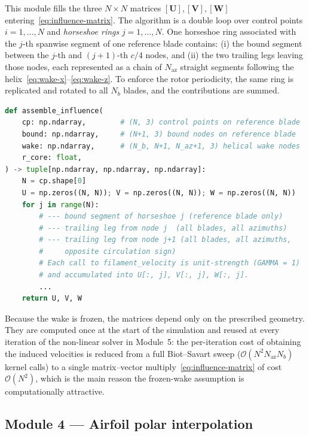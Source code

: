 This module fills the three $N\times N$ matrices $[\mathbf{U}],[\mathbf{V}],[\mathbf{W}]$ entering~\eqref{eq:influence-matrix}. The algorithm is a double loop over control points $i=1,\dots,N$ and \emph{horseshoe rings} $j=1,\dots,N$. One horseshoe ring associated with the $j$-th spanwise segment of one reference blade contains: (i) the bound segment between the $j$-th and $(j{+}1)$-th $c/4$ nodes, and (ii) the two trailing legs leaving those nodes, each represented as a chain of $N_{\text{az}}$ straight segments following the helix~\eqref{eq:wake-x}--\eqref{eq:wake-z}. To enforce the rotor periodicity, the same ring is replicated and rotated to all $N_b$ blades, and the contributions are summed.

\begin{lstlisting}[language=Python]
def assemble_influence(
    cp: np.ndarray,        # (N, 3) control points on reference blade
    bound: np.ndarray,     # (N+1, 3) bound nodes on reference blade
    wake: np.ndarray,      # (N_b, N+1, N_az+1, 3) helical wake nodes
    r_core: float,
) -> tuple[np.ndarray, np.ndarray, np.ndarray]:
    N = cp.shape[0]
    U = np.zeros((N, N)); V = np.zeros((N, N)); W = np.zeros((N, N))
    for j in range(N):
        # --- bound segment of horseshoe j (reference blade only)
        # --- trailing leg from node j  (all blades, all azimuths)
        # --- trailing leg from node j+1 (all blades, all azimuths,
        #     opposite circulation sign)
        # Each call to filament_velocity is unit-strength (GAMMA = 1)
        # and accumulated into U[:, j], V[:, j], W[:, j].
        ...
    return U, V, W
\end{lstlisting}

Because the wake is frozen, the matrices depend only on the prescribed geometry. They are computed once at the start of the simulation and reused at every iteration of the non-linear solver in Module~5: the per-iteration cost of obtaining the induced velocities is reduced from a full Biot--Savart sweep ($\mathcal{O}(N^2 N_{\text{az}} N_b)$ kernel calls) to a single matrix--vector multiply~\eqref{eq:influence-matrix} of cost $\mathcal{O}(N^2)$, which is the main reason the frozen-wake assumption is computationally attractive.

\subsection{Module 4 --- Airfoil polar interpolation}
\label{sec:code-polar}

